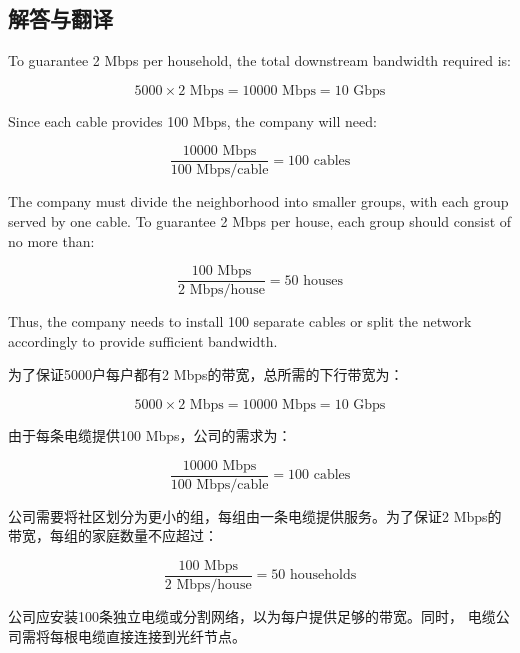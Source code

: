\subsection{解答与翻译}

To guarantee 2 Mbps per household, the total downstream bandwidth required is:

\[
5000 \times 2 \text{ Mbps} = 10000 \text{ Mbps} = 10 \text{ Gbps}
\]

Since each cable provides 100 Mbps, the company will need:

\[
\frac{10000 \text{ Mbps}}{100 \text{ Mbps/cable}} = 100 \text{ cables}
\]

The company must divide the neighborhood into smaller groups, with each group served by one cable. To guarantee 2 Mbps per house, each group should consist of no more than:

\[
\frac{100 \text{ Mbps}}{2 \text{ Mbps/house}} = 50 \text{ houses}
\]

Thus, the company needs to install 100 separate cables or split the network accordingly to provide sufficient bandwidth.

\vspace{10pt}

为了保证5000户每户都有2 Mbps的带宽，总所需的下行带宽为：

\[
5000 \times 2 \text{ Mbps} = 10000 \text{ Mbps} = 10 \text{ Gbps}
\]

由于每条电缆提供100 Mbps，公司的需求为：

\[
\frac{10000 \text{ Mbps}}{100 \text{ Mbps/cable}} = 100 \text{ cables}
\]

公司需要将社区划分为更小的组，每组由一条电缆提供服务。为了保证2 Mbps的带宽，每组的家庭数量不应超过：

\[
\frac{100 \text{ Mbps}}{2 \text{ Mbps/house}} = 50 \text{ households}
\]

公司应安装100条独立电缆或分割网络，以为每户提供足够的带宽。同时，
电缆公司需将每根电缆直接连接到光纤节点。


